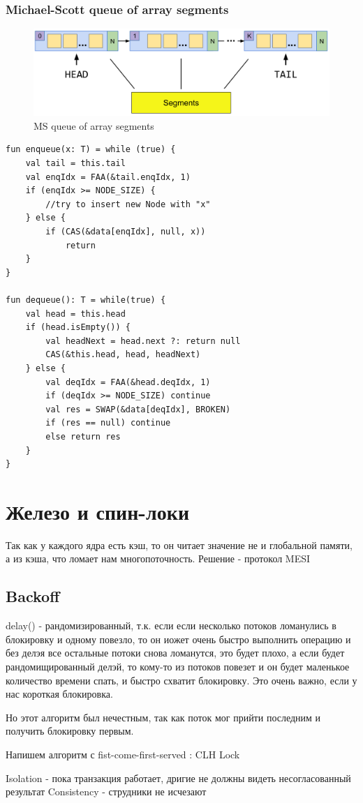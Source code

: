 \documentclass[10pt,a4paper,oneside,titlepage]{article}
\theoremstyle{plain}
\theoremstyle{defenition}
\begin{document}
\subsubsection{Michael-Scott queue of array segments}

\begin{figure}[h!]
	\centering
	\includegraphics[width=0.4\linewidth]{pictures/MSQueue1}
	\caption{MS queue of array segments}
	\label{fig:msqueue1}
\end{figure}

\begin{lstlisting}
fun enqueue(x: T) = while (true) {
    val tail = this.tail
    val enqIdx = FAA(&tail.enqIdx, 1)
    if (enqIdx >= NODE_SIZE) {
        //try to insert new Node with "x"
    } else {
        if (CAS(&data[enqIdx], null, x))
            return
    }
}

fun dequeue(): T = while(true) {
    val head = this.head
    if (head.isEmpty()) {
        val headNext = head.next ?: return null
        CAS(&this.head, head, headNext)
    } else {
        val deqIdx = FAA(&head.deqIdx, 1)
        if (deqIdx >= NODE_SIZE) continue
        val res = SWAP(&data[deqIdx], BROKEN)
        if (res == null) continue
        else return res
    }
}
\end{lstlisting}


\section{Железо и спин-локи}
Так как у каждого ядра есть кэш, то он читает значение не и глобальной памяти, а из кэша, что ломает нам многопоточность. Решение - протокол MESI

\subsection{Backoff}
delay() - рандомизированный, т.к. если если несколько потоков ломанулись в блокировку и одному повезло, то он иожет очень быстро выполнить операцию и без делэя все остальные потоки снова ломанутся, это будет плохо, а если будет рандомищированный делэй, то кому-то из потоков повезет и он будет маленькое количество времени спать, и быстро схватит блокировку. Это очень важно, если у нас короткая блокировка.

Но этот алгоритм был нечестным, так как поток мог прийти последним и получить блокировку первым.

Напишем алгоритм с fist-come-first-served : CLH Lock

Isolation - пока транзакция работает, дригие не должны видеть несогласованный результат
Consistency - струдники не исчезают
\end{document}
